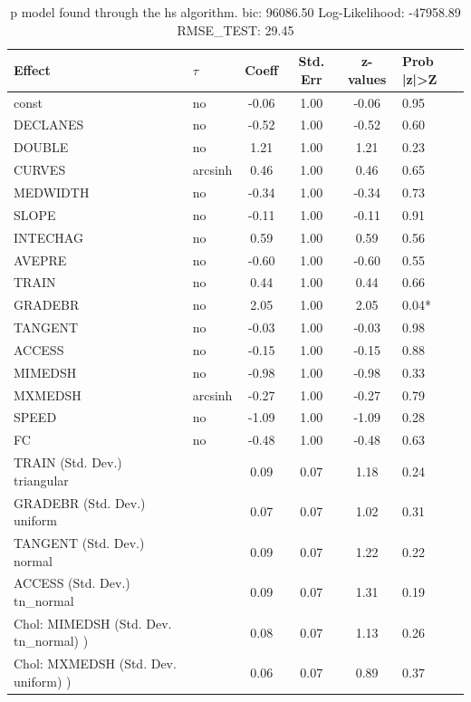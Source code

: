 \begin{table}
	\caption{p model found through the hs algorithm. bic: 96086.50 Log-Likelihood: -47958.89 RMSE_TEST: 29.45}
	\begin{center}
		\begin{tabular}{|l|l|c|c|c|l|}
			\hline
			Effect & $\tau$ & Coeff & Std. Err & z-values & Prob |z|>Z \\
			\hline
			const & no & -0.06 & 1.00 & -0.06 & 0.95 \\
			\hline
			DECLANES & no & -0.52 & 1.00 & -0.52 & 0.60 \\
			\hline
			DOUBLE & no & 1.21 & 1.00 & 1.21 & 0.23 \\
			\hline
			CURVES & arcsinh & 0.46 & 1.00 & 0.46 & 0.65 \\
			\hline
			MEDWIDTH & no & -0.34 & 1.00 & -0.34 & 0.73 \\
			\hline
			SLOPE & no & -0.11 & 1.00 & -0.11 & 0.91 \\
			\hline
			INTECHAG & no & 0.59 & 1.00 & 0.59 & 0.56 \\
			\hline
			AVEPRE & no & -0.60 & 1.00 & -0.60 & 0.55 \\
			\hline
			TRAIN & no & 0.44 & 1.00 & 0.44 & 0.66 \\
			\hline
			GRADEBR & no & 2.05 & 1.00 & 2.05 & 0.04* \\
			\hline
			TANGENT & no & -0.03 & 1.00 & -0.03 & 0.98 \\
			\hline
			ACCESS & no & -0.15 & 1.00 & -0.15 & 0.88 \\
			\hline
			MIMEDSH & no & -0.98 & 1.00 & -0.98 & 0.33 \\
			\hline
			MXMEDSH & arcsinh & -0.27 & 1.00 & -0.27 & 0.79 \\
			\hline
			SPEED & no & -1.09 & 1.00 & -1.09 & 0.28 \\
			\hline
			FC & no & -0.48 & 1.00 & -0.48 & 0.63 \\
			\hline
			TRAIN (Std. Dev.) triangular &  & 0.09 & 0.07 & 1.18 & 0.24 \\
			\hline
			GRADEBR (Std. Dev.) uniform &  & 0.07 & 0.07 & 1.02 & 0.31 \\
			\hline
			TANGENT (Std. Dev.) normal &  & 0.09 & 0.07 & 1.22 & 0.22 \\
			\hline
			ACCESS (Std. Dev.) tn_normal &  & 0.09 & 0.07 & 1.31 & 0.19 \\
			\hline
			 Chol: MIMEDSH (Std. Dev. tn_normal) ) &  & 0.08 & 0.07 & 1.13 & 0.26 \\
			\hline
			 Chol: MXMEDSH (Std. Dev. uniform) ) &  & 0.06 & 0.07 & 0.89 & 0.37 \\

\end{tabular}
\end{center}
\end{table}
